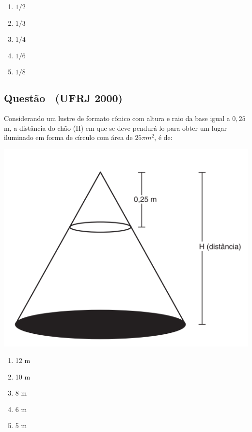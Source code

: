 \documentclass[12pt]{article}
\newif\ifmostravermelho
\newcommand{\vermelho}[1]{%
  \ifmostravermelho
    {\color{red}#1}%
  \else
    #1%
  \fi
}
\newcounter{questao}
\newcommand{\novaquestao}[1]{%
  \stepcounter{questao}%
  \subsection*{Questão \thequestao\ (#1)}%
}
\begin{document}
\begin{multicols}{2}
            \begin{enumerate}[label=(\alph*), noitemsep]
                \item ${1}/{2}$
                \item ${1}/{3}$
                \item ${1}/{4}$ 
                \item \vermelho{${1}/{6}$} %
                \item ${1}/{8}$
            \end{enumerate}
        
        \novaquestao{UFRJ 2000}
            Considerando um lustre de formato cônico com altura e raio da base igual a $0,25$ m, a distância do chão (H) em que se deve pendurá-lo para obter um lugar iluminado em forma de círculo com área de $25\pi m^{2}$, é de:

            \begin{center}
                \includegraphics[scale=0.5]{UFRJ-CONE.png}
            \end{center} 
            
            \begin{enumerate}[label=(\alph*), noitemsep]
                \item 12 m
                \item 10 m
                \item 8 m
                \item 6 m
                \item \vermelho{5 m} %
            \end{enumerate}


\end{multicols}
\end{document}
